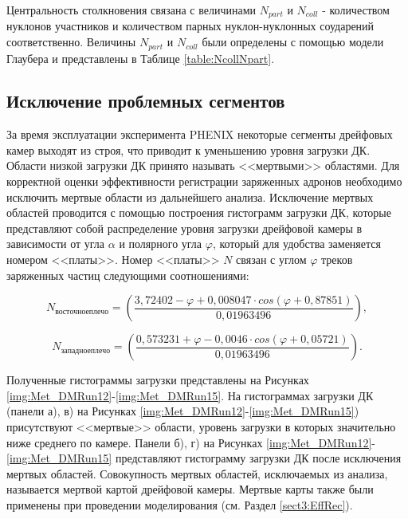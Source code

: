 Центральность столкновения связана с величинами $N_{part}$ и $N_{coll}$ - количеством нуклонов участников и количеством парных нуклон-нуклонных соударений соответственно. Величины $N_{part}$ и $N_{coll}$ были определены с помощью модели Глаубера и представлены в Таблице \ref{table:NcollNpart}.

\subsection{Исключение проблемных сегментов} \label{sect3_DM}
За время эксплуатации эксперимента PHENIX некоторые сегменты дрейфовых камер выходят из строя, что приводит к уменьшению уровня загрузки ДК. Области низкой загрузки ДК принято называть <<мертвыми>> областями. 
Для корректной оценки эффективности регистрации заряженных адронов необходимо исключить мертвые области из дальнейшего анализа. 
Исключение мертвых областей проводится с помощью построения гистограмм загрузки ДК, которые представляют собой распределение уровня загрузки дрейфовой камеры в зависимости от угла $\alpha$ и полярного угла $\varphi$, который для удобства заменяется номером <<платы>>. Номер <<платы>> $N$ связан с углом $\varphi$ треков заряженных частиц следующими соотношениями: 

\begin{equation}
	N_{восточное плечо} = \left( \frac{3,72402 - \varphi + 0,008047 \cdot cos(\varphi + 0,87851)}{0,01963496} \right),
\end{equation}


\begin{equation}
	N_{западное плечо} = \left( \frac{0,573231 + \varphi - 0,0046 \cdot cos(\varphi + 0,05721)}{0,01963496} \right).
\end{equation}

Полученные гистограммы загрузки представлены на Рисунках \ref{img:Met_DMRun12}-\ref{img:Met_DMRun15}. 
На гистограммах загрузки ДК (панели а), в) на Рисунках \ref{img:Met_DMRun12}-\ref{img:Met_DMRun15}) присутствуют <<мертвые>> области, уровень загрузки в которых значительно ниже среднего по камере. 
Панели б), г) на Рисунках \ref{img:Met_DMRun12}-\ref{img:Met_DMRun15} представляют гистограмму загрузки ДК после исключения мертвых областей. 
Совокупность мертвых областей, исключаемых из анализа, называется мертвой картой дрейфовой камеры. Мертвые карты также были применены при проведении моделирования (см. Раздел \ref{sect3:EffRec}).


